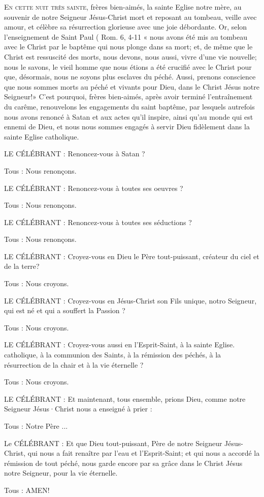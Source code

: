 \documentclass[%
fontsize=14%
,a4paper%
,DIV=15%
]{scrartcl}
\title{\centrer{\huge{Veillée pascale}}}
\author{\texttt{[image: PâquesN-B.jpg]}}
\date{la nuit de la Résurrection\\ avec baptêmes d'adultes}
\begin{document}
\newfontfamily{}
    \def\gretextformat#1{{\fontsize{\taillepolice}{\taillepolice}\selectfont #1}}
    \def\greinitialformat#1{{\lettrines #1}}
    

\lettrine{E}{n cette nuit très sainte}, frères bien-aimés, la sainte Eglise notre
mère, au souvenir de notre Seigneur Jésus-Christ mort et reposant
au tombeau, veille avec amour, et célèbre sa résurrection glorieuse
avec une joie débordante.
Or, selon l'enseignement de Saint Paul ( Rom. 6, 4-11 « nous avons
été mis au tombeau avec le Christ par le baptême qui nous plonge dans
sa mort; et, de même que le Christ est ressuscité des morts, nous devons,
nous aussi, vivre d'une vie nouvelle; nous le savons, le vieil homme
que nous étions a été crucifié avec le Christ pour que, désormais, nous
ne soyons plus esclaves du péché. Aussi, prenons conscience que nous
sommes morts au péché et vivants pour Dieu, dans le Christ Jésus notre
Seigneur!»
C'est pourquoi, frères bien-aimés, après avoir terminé l'entraînement
du carême, renouvelons les engagements du saint baptême, par lesquels
autrefois nous avons renoncé à Satan et aux actes qu'il inspire, ainsi
qu'au monde qui est ennemi de Dieu, et nous nous sommes engagés
à servir Dieu fidèlement dans la sainte Eglise catholique.

LE CÉLÉBRANT : Renoncez-vous à Satan ?

Tous : Nous renonçons.

LE CÉLÉBRANT : Renoncez-vous à toutes ses oeuvres ?

Tous : Nous renonçons.

LE CÉLÉBRANT : Renoncez-vous à toutes ses séductions ?

Tous : Nous renonçons.

LE CÉLÉBRANT : Croyez-vous en Dieu le Père tout-puissant, créateur
du ciel et de la terre?

Tous : Nous croyons.

LE CÉLÉBRANT : Croyez-vous en Jésus-Christ son Fils unique, notro
Seigneur, qui est né et qui a souffert la Passion ?

Tous : Nous croyons.

LE CÉLÉBRANT : Croyez-vous aussi en l'Esprit-Saint, à la sainte Eglise.
catholique, à la communion des Saints, à la rémission
des péchés, à la résurrection de la chair et à la vie
éternelle ?

Tous : Nous croyons.

LE CÉLÉBRANT : Et maintenant, tous ensemble, prions Dieu, comme
notre Seigneur Jésus·Christ nous a enseigné à prier : 

Tous : Notre Père ...

Le CÉLÉBRANT : Et que Dieu tout-puissant, Père de notre Seigneur
Jésus-Christ, qui nous a fait renaître par l'eau et
l'Esprit-Saint; et qui nous a accordé la rémission
de tout péché, nous garde encore par sa grâce dans le
Christ Jésus notre Seigneur, pour la vie éternelle.

Tous : AMEN!

\end{document}
